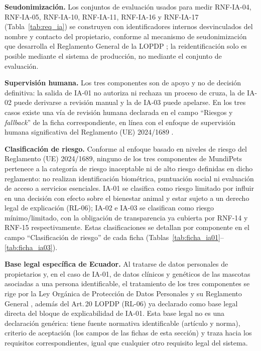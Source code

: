 \documentclass[journal,onecolumn]{IEEEtran}
\begin{document}
\textbf{Seudonimización.} Los conjuntos de evaluación usados para medir RNF-IA-04, RNF-IA-05,
RNF-IA-10, RNF-IA-11, RNF-IA-16 y RNF-IA-17 (Tabla~\ref{tab:req_ia}) se construyen con
identificadores internos desvinculados del nombre y contacto del propietario, conforme al
mecanismo de seudonimización que desarrolla el Reglamento General de la LOPDP
\cite{lopdp_reglamento2023}; la reidentificación solo es posible mediante el sistema de
producción, no mediante el conjunto de evaluación.

\textbf{Supervisión humana.} Los tres componentes son de apoyo y no de decisión definitiva: la
salida de IA-01 no autoriza ni rechaza un proceso de cruza, la de IA-02 puede derivarse a
revisión manual y la de IA-03 puede apelarse. En los tres casos existe una vía de revisión
humana declarada en el campo ``Riesgos y \textit{fallback}'' de la ficha correspondiente, en
línea con el enfoque de supervisión humana significativa del Reglamento (UE) 2024/1689
\cite{euaiact2024}.

\textbf{Clasificación de riesgo.} Conforme al enfoque basado en niveles de riesgo del
Reglamento (UE) 2024/1689, ninguno de los tres componentes de MundiPets pertenece a la
categoría de riesgo inaceptable ni de alto riesgo definidas en dicho reglamento: no realizan
identificación biométrica, puntuación social ni evaluación de acceso a servicios esenciales.
IA-01 se clasifica como riesgo limitado por influir en una decisión con efecto sobre el
bienestar animal y estar sujeto a un derecho legal de explicación (RL-06); IA-02 e IA-03 se
clasifican como riesgo mínimo/limitado, con la obligación de transparencia ya cubierta por
RNF-14 y RNF-15 respectivamente. Estas clasificaciones se detallan por componente en el campo
``Clasificación de riesgo'' de cada ficha (Tablas~\ref{tab:ficha_ia01}--\ref{tab:ficha_ia03}).

\textbf{Base legal específica de Ecuador.} Al tratarse de datos personales de propietarios y,
en el caso de IA-01, de datos clínicos y genéticos de las mascotas asociadas a una persona
identificable, el tratamiento de los tres componentes se rige por la Ley Orgánica de
Protección de Datos Personales \cite{lopdp2021} y su Reglamento General
\cite{lopdp_reglamento2023}, además del Art.\,20 LOPDP (RL-06) ya declarado como base legal
directa del bloque de explicabilidad de IA-01. Esta base legal no es una declaración genérica:
tiene fuente normativa identificable (artículo y norma), criterio de aceptación (los campos de
las fichas de esta sección) y traza hacia los requisitos correspondientes, igual que cualquier
otro requisito legal del sistema.
\end{document}
